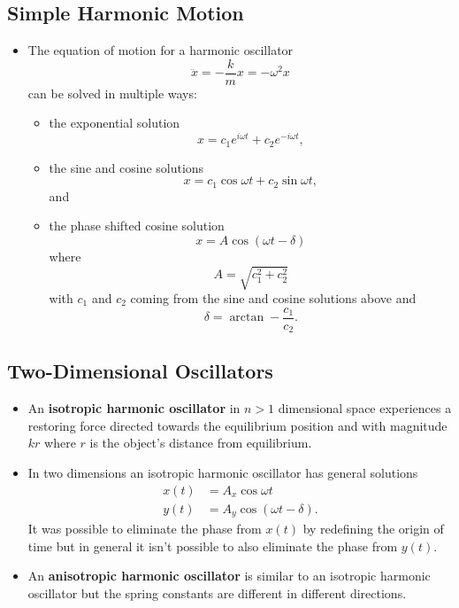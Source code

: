 \documentclass{article}
\begin{document}
\setcounter{subsection}{1}
\subsection{Simple Harmonic Motion}

\begin{itemize}
  \item The equation of motion for a harmonic oscillator \[\ddot{x} = -\frac{k}{m} x = -\omega^2 x\] can be solved in multiple ways:

        \begin{itemize}
          \item the exponential solution \[x = c_1 e^{i \omega t} + c_2 e^{-i \omega t},\]

          \item the sine and cosine solutions \[x = c_1 \cos \omega t + c_2 \sin \omega t,\] and

          \item the phase shifted cosine solution \[x = A \cos (\omega t - \delta)\] where \[A = \sqrt{c_1^2 + c_2^2}\] with $c_1$ and $c_2$ coming from the sine and cosine solutions above and \[\delta = \arctan -\frac{c_1}{c_2}.\]
        \end{itemize}
\end{itemize}

\subsection{Two-Dimensional Oscillators}

\begin{itemize}
  \item An \textbf{isotropic harmonic oscillator} in $n > 1$ dimensional space experiences a restoring force directed towards the equilibrium position and with magnitude $k r$ where $r$ is the object's distance from equilibrium.

  \item In two dimensions an isotropic harmonic oscillator has general solutions \begin{align*}
          x(t) & = A_x \cos \omega t             \\
          y(t) & = A_y \cos (\omega t - \delta).
        \end{align*} It was possible to eliminate the phase from $x(t)$ by redefining the origin of time but in general it isn't possible to also eliminate the phase from $y(t)$.

  \item An \textbf{anisotropic harmonic oscillator} is similar to an isotropic harmonic oscillator but the spring constants are different in different directions.
\end{itemize}
\end{document}
